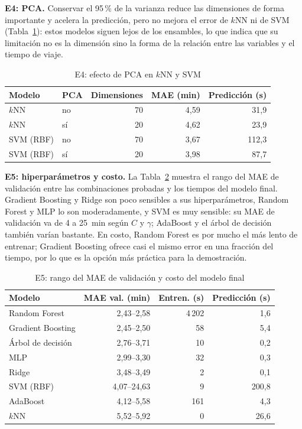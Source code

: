 \documentclass[conference,a4paper]{IEEEtran}
\begin{document}
\textbf{E4: PCA.} Conservar el 95\,\% de la varianza reduce las dimensiones de forma importante y acelera la predicción, pero no mejora el error de $k$NN ni de SVM (Tabla~\ref{tab:pca}): estos modelos siguen lejos de los ensambles, lo que indica que su limitación no es la dimensión sino la forma de la relación entre las variables y el tiempo de viaje.

\begin{table}[t]
\centering
\caption{E4: efecto de PCA en $k$NN y SVM}
\label{tab:pca}
\footnotesize
\begin{tabular}{@{}llrrr@{}}
\toprule
Modelo & PCA & Dimensiones & MAE (min) & Predicción (s) \\
\midrule
$k$NN & no & 70 & 4,59 & 31,9 \\
$k$NN & sí & 20 & 4,62 & 23,9 \\
SVM (RBF) & no & 70 & 3,67 & 112,3 \\
SVM (RBF) & sí & 20 & 3,98 & 87,7 \\
\bottomrule
\end{tabular}
\end{table}

\textbf{E5: hiperparámetros y costo.} La Tabla~\ref{tab:cost} muestra el rango del MAE de validación entre las combinaciones probadas y los tiempos del modelo final. Gradient Boosting y Ridge son poco sensibles a sus hiperparámetros, Random Forest y MLP lo son moderadamente, y SVM es muy sensible: su MAE de validación va de 4 a 25~min según $C$ y $\gamma$; AdaBoost y el árbol de decisión también varían bastante. En costo, Random Forest es por mucho el más lento de entrenar; Gradient Boosting ofrece casi el mismo error en una fracción del tiempo, por lo que es la opción más práctica para la demostración.

\begin{table}[t]
\centering
\caption{E5: rango del MAE de validación y costo del modelo final}
\label{tab:cost}
\footnotesize
\begin{tabular}{@{}lrrr@{}}
\toprule
Modelo & MAE val. (min) & Entren. (s) & Predicción (s) \\
\midrule
Random Forest & 2,43--2,58 & 4\,202 & 1,6 \\
Gradient Boosting & 2,45--2,50 & 58 & 5,4 \\
Árbol de decisión & 2,76--3,71 & 10 & 0,2 \\
MLP & 2,99--3,30 & 32 & 0,3 \\
Ridge & 3,48--3,49 & 2 & 0,1 \\
SVM (RBF) & 4,07--24,63 & 9 & 200,8 \\
AdaBoost & 4,12--5,58 & 161 & 4,3 \\
$k$NN & 5,52--5,92 & 0 & 26,6 \\
\bottomrule
\end{tabular}
\end{table}
\end{document}
